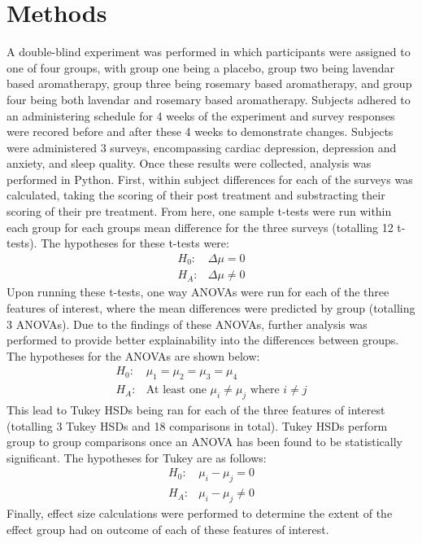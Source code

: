 \documentclass{article}
\begin{document}
\section{Methods}
A double-blind experiment was performed in which participants were assigned to
one of four groups, with group one being a placebo, group two being lavendar based
aromatherapy, group three being rosemary based aromatherapy, and group four being
both lavendar and rosemary based aromatherapy.  Subjects adhered to an
administering schedule for 4 weeks of the experiment and survey responses were
recored before and after these 4 weeks to demonstrate changes.  Subjects were
administered 3 surveys, encompassing cardiac depression, depression and
anxiety, and sleep quality.
\hfill \break \hfill \break
 Once these results were collected, analysis was performed in Python.  First,
within subject differences for each of the surveys was calculated, taking the
scoring of their post treatment and substracting their scoring of their pre treatment.
From here, one sample t-tests were run within each group for each groups mean
difference for the three surveys (totalling 12 t-tests).  The hypotheses for
these t-tests were:
\begin{align}
    H_0:& \Delta\mu=0\\
    H_A:& \Delta\mu\neq 0
\end{align}
Upon running these t-tests, one way ANOVAs were run for each of the three features of
interest, where the mean differences were predicted by group (totalling 3 ANOVAs).  Due to the findings
of these ANOVAs, further analysis was performed to provide better explainability
into the differences between groups. The hypotheses for the ANOVAs are shown below:
\begin{align}
    H_0:& \mu_1=\mu_2=\mu_3=\mu_4\\
    H_A:& \text{At least one }\mu_i\neq\mu_j\text{ where $i\neq j$}
\end{align}
This lead to Tukey HSDs being ran for each of the three features of interest (totalling 3 Tukey HSDs and 18 comparisons in
total).  Tukey HSDs perform group to group comparisons once an ANOVA has been found
to be statistically significant. The hypotheses for Tukey are as follows:
\begin{align}
	H_0:& \mu_i-\mu_j=0\\
    H_A:& \mu_i-\mu_j\neq0
\end{align}
Finally, effect size calculations were performed to determine the
extent of the effect group had on outcome of each of these features of
interest.
\end{document}
